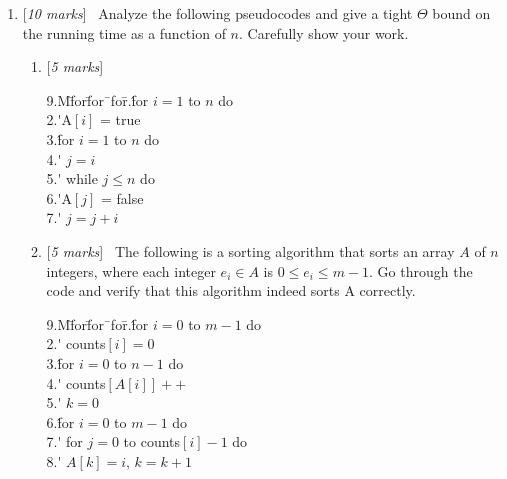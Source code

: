 \documentclass[11pt]{article}
\newcommand{\Q}[1]{\medskip\item {[{\em #1 marks\/}]}\ }
\newif\ifsol
\newcommand{\solution}[1]{{\ifsol \color{red} {#1} \fi}}
\begin{document}
\begin{enumerate}
\begin{enumerate}
\solution{
    $f(n)\in \omega (g(n))$\\
    $f(n) = 2^{\log(n) \cdot \log(n)} = n^{\log(n)}$\\
    $\lim_{n \to \infty} \frac {n^{\log(n)}} {n^{2012}} >\lim_{n \to \infty} \frac {n^2013} {n^{2012}}
    =\lim_{n \to \infty} n=\infty$
}

\end{enumerate}

\newpage 
\Q{10}
Analyze the following pseudocodes and give a tight $\Theta$
bound on the running time as a function of $n$.  Carefully show your work.

\begin{enumerate}
\Q{5} 
\begin{tabbing}
9.M\= for\= for\=\ for\=\+.\' for $i=1$ to $n$ do \\
2.\'\>A$[i]$ = true\\  
3.\' for $i=1$ to $n$ do \\
4.\'\> $j=i$\\
5.\'\> while $j \le n$ do\\
6.\'\>\>A$[j]$ = false\\
7.\'\>\> $j=j+i$\\
\end{tabbing}

\solution{
    \begin{align*}
        T(n) & = n + \sum_{i = 1}^{n} \lfloor \frac {2 n} {i} \rfloor\\
        & \leq n + \sum_{i = 1}^{n} \frac {2 n} {i}\\
        & = n + 2n \Theta (\log n)\\
        & \in O(n \log n)
    \end{align*}
Also, 
    \begin{align*}
        T(n) & = n + \sum_{i = 1}^{n} \lfloor \frac {2 n} {i} \rfloor\\
        & \geq n + \sum_{i = 1}^{n} \frac {1} {i}\\
        & = n + n \Theta (\log n)\\
        & \in \Omega(n \log n)
    \end{align*}
Hence, $T(n) \in \Theta(n \log n)$
}


\Q{5}
The following is a sorting algorithm that sorts an array $A$ of $n$ integers, where each integer $e_i \in A$ is $0 \le e_i \le m-1$.  Go through the code and verify that this algorithm indeed sorts A correctly.
\begin{tabbing}
9.M\= for\= for\=\ for\=\+.\' for $i=0$ to $m-1$ do\\
2.\'\> counts$[i]=0$\\
3.\' for $i=0$ to $n-1$ do\\
4.\'\> counts$[A[i]]++$\\
5.\' $k=0$\\
6.\' for $i=0$ to $m-1$ do\\
7.\'\> for $j=0$ to counts$[i]-1$ do\\
8.\'\>\> $A[k]=i$, $k=k+1$
\end{tabbing}


\end{enumerate}
\end{enumerate}
\end{document}
